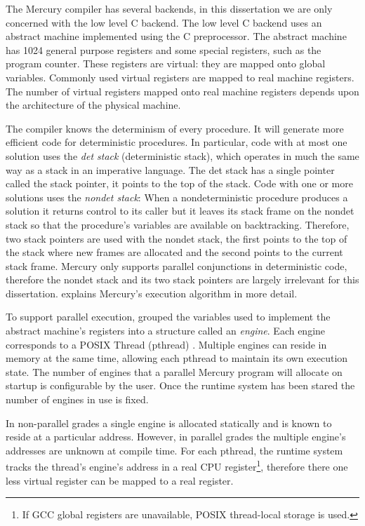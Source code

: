 
The Mercury compiler has several backends,
in this dissertation we are only concerned with the low level C backend.
The low level C backend uses an abstract machine implemented using the C
preprocessor.
The abstract machine has 1024 general purpose registers and some
special registers, such as the program counter.
These registers are virtual:
they are mapped onto global variables.
Commonly used virtual registers are mapped to real machine registers.
The number of virtual registers mapped onto real machine registers depends upon
the architecture of the physical machine.

The compiler knows the determinism of every procedure.
It will generate more efficient code for deterministic procedures.
In particular,
code with at most one solution uses the \emph{det stack} (deterministic
stack),
which operates in much the same way as a stack in an imperative
language.
The det stack has a single pointer called the stack pointer,
it points to the top of the stack.
Code with one or more solutions uses the \emph{nondet stack}:
When a nondeterministic procedure produces a solution it returns control to
its caller but
it leaves its stack frame on the nondet stack so that
the procedure's variables are available on backtracking.
Therefore,
two stack pointers are used with the nondet stack,
the first points to the top of the stack where new frames are allocated
and the second points to the current stack frame.
Mercury only supports parallel conjunctions in deterministic code,
therefore the nondet stack and its two stack pointers are largely irrelevant
for this dissertation.
\citet{mercury_jlp} explains Mercury's execution algorithm in more detail.

\label{page:engine}
To support parallel execution,
\citet{conway:2002:par} grouped the variables used to implement the abstract
machine's registers into a structure called an \emph{engine}.
Each engine corresponds to a POSIX Thread (pthread)
\citep{butenhof1997:pthreads}.
Multiple engines can reside in memory at the same time,
allowing each pthread to maintain its own execution state.
The number of engines that a parallel Mercury program will allocate on startup
is configurable by the user.
Once the runtime system has been stared the number of engines in use is
fixed.

In non-parallel grades a single engine is allocated statically and is known
to reside at a particular address.
However,
in parallel grades the multiple engine's addresses are unknown at compile
time.
For each pthread,
the runtime system tracks the thread's engine's address in a real CPU
register\footnote{
    If GCC global registers are unavailable,
    POSIX thread-local storage is used.
},
therefore there one less virtual register can be mapped to a real register.

